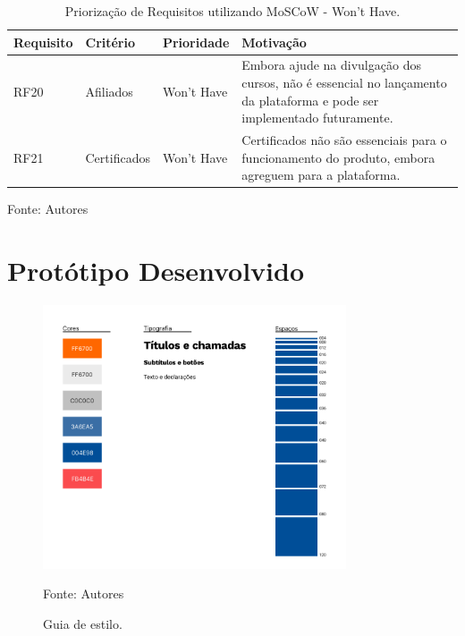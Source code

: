 \begin{apendicesenv}
\begin{table}[h]
    \centering
    \caption{Priorização de Requisitos utilizando MoSCoW - Won’t Have.}
    \label{tab:priorizacao_moscow4}
    \begin{adjustbox}{width=\textwidth}
        \begin{tabular}{|p{2.5cm}|p{5cm}|p{5cm}|p{4cm}|}
            \hline
            \textbf{Requisito} & \textbf{Critério} & \textbf{Prioridade} & \textbf{Motivação} \\
            \hline
            RF20 & Afiliados & Won’t Have & Embora ajude na divulgação dos cursos, não é essencial no lançamento da plataforma e pode ser implementado futuramente. \\
            \hline
            RF21 & Certificados & Won’t Have & Certificados não são essenciais para o funcionamento do produto, embora agreguem para a plataforma. \\
            \hline
        \end{tabular}
    \end{adjustbox}

    \vspace{5mm}
    {\footnotesize Fonte: Autores} 
\end{table}


\chapter{Protótipo Desenvolvido}

    \begin{figure}[h]
        \centering
        \caption{Guia de estilo.}
        \includegraphics[width=0.8\textwidth]{figuras/guia-de-estilo.png}
        \begin{center}
            {\footnotesize Fonte: Autores}
        \end{center}
        \label{fig:guia-de-estilo}
    \end{figure}


\end{apendicesenv}
